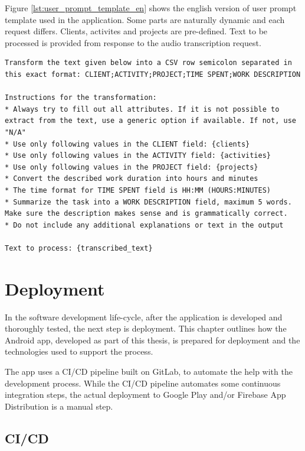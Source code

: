 \documentclass[
  digital,     %
  oneside,     %
  nosansbold,  %
  nocolorbold, %
  lof,         %
  lot,         %
]{fithesis4}
\begin{document}
\newpage
Figure \ref{lst:user_prompt_template_en} shows the english version of user prompt template used in the application. Some parts are naturally dynamic and each request differs. Clients, activites and projects are pre-defined. Text to be processed is provided from response to the audio transcription request.

\begin{lstlisting}[caption={English version of the user prompt template used in the application}, label={lst:user_prompt_template_en}, floatplacement=ht, showstringspaces=false]
Transform the text given below into a CSV row semicolon separated in this exact format: CLIENT;ACTIVITY;PROJECT;TIME SPENT;WORK DESCRIPTION

Instructions for the transformation:
* Always try to fill out all attributes. If it is not possible to extract from the text, use a generic option if available. If not, use "N/A"
* Use only following values in the CLIENT field: {clients}
* Use only following values in the ACTIVITY field: {activities}
* Use only following values in the PROJECT field: {projects}
* Convert the described work duration into hours and minutes
* The time format for TIME SPENT field is HH:MM (HOURS:MINUTES)
* Summarize the task into a WORK DESCRIPTION field, maximum 5 words. Make sure the description makes sense and is grammatically correct.
* Do not include any additional explanations or text in the output

Text to process: {transcribed_text}
\end{lstlisting}

\chapter{Deployment}
\label{chap:deployment}

In the software development life-cycle, after the application is developed and thoroughly tested, the next step is deployment. This chapter outlines how the Android app, developed as part of this thesis, is prepared for deployment and the technologies used to support the process.

The app uses a \gls{CI}/\gls{CD} pipeline built on GitLab, to automate the help with the development process.  While the \gls{CI}/\gls{CD} pipeline automates some continuous integration steps, the actual deployment to Google Play and/or Firebase App Distribution is a manual step.

\section{CI/CD}
\end{document}
